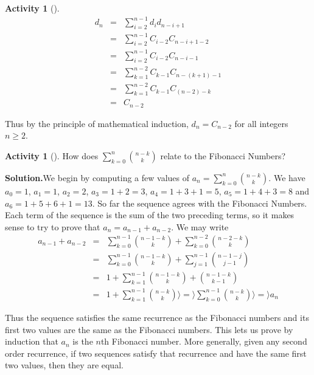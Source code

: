 \documentclass[10pt,]{book}
\theoremstyle{plain}
\theoremstyle{definition}
\newtheorem{activity}[project]{Activity}
\numberwithin{equation}{chapter}
\newcommand{\amp}{&}
\begin{document}
\begin{activity}[]
\begin{align*}
d_n\amp =\amp \sum\limits_{i=2}^{n-1} d_id_{n-i+1}\\
\amp =\amp \sum\limits_{i=2}^{n-1} C_{i-2}C_{n-i+1-2}\\
\amp =\amp \sum\limits_{i=2}^{n-1} C_{i-2}C_{n-i-1}\\
\amp =\amp \sum\limits_{k=1}^{n-2} C_{k-1}C_{n-(k+1)-1}\\
\amp =\amp \sum\limits_{k=1}^{n-2} C_{k-1}C_{(n-2)-k}\\
\amp =\amp C_{n-2}
\end{align*}
%
\par
Thus by the principle of mathematical induction, \(d_n=C_{n-2}\) for all integers \(n\ge 2\).%
\end{activity}
\begin{activity}[]\label{activity-201}
How does \(\sum_{k=0}^n\binom{n-k}{k}\) relate to the Fibonacci Numbers?%
\par\medskip\noindent%
\textbf{Solution.}\quad We begin by computing a few values of \(a_n=\sum_{k=0}^n\binom{n-k}{k}\). We have \(a_0=1\), \(a_1=1\), \(a_2=2\), \(a_3=1+2=3\), \(a_4=1+3+1=5\), \(a_5=1+4+3=8\) and \(a_6=1+5+6+1=13\). So far the sequence agrees with the Fibonacci Numbers. Each term of the sequence is the sum of the two preceding terms, so it makes sense to try to prove that \(a_n=a_{n-1}+a_{n-2}\). We may write%
\begin{align*}
a_{n-1}+a_{n-2}
\amp =\amp \sum_{k=0}^{n-1} \binom{n-1-k}{k}
+\sum_{k=0}^{n-2} \binom{n-2-k}{k}\\
\amp =\amp \sum_{k=0}^{n-1} \binom{n-1-k}{k}+\sum_{j=1}^{n-1}\binom{n-1-j}{j-1}\\
\amp =\amp 1+\sum_{k=1}^{n-1}\binom{n-1-k}{k}+\binom{n-1-k}{k-1}\\
\amp =\amp 1+\sum_{k=1}^{n-1}\binom{n-k}{k} \rangle =\rangle  \sum_{k=0}^{n-1}\binom{n-k}{k}
\rangle =\rangle  a_n
\end{align*}
%
\par
Thus the sequence satisfies the same recurrence as the Fibonacci numbers and its first two values are the same as the Fibonacci numbers. This lets us prove by induction that \(a_n\) is the \(n\)th Fibonacci number. More generally, given any second order recurrence, if two sequences satisfy that recurrence and have the same first two values, then they are equal.%
\end{activity}
\end{document}
